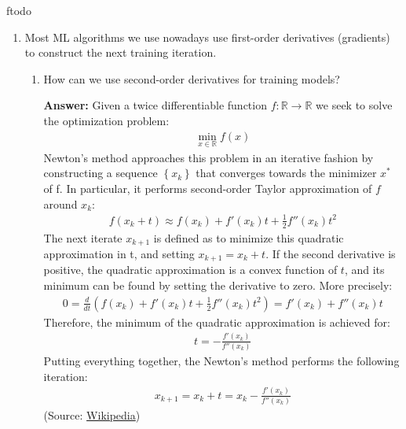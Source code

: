 ƒtodo\documentclass{article}
\newenvironment{QandA}{\begin{enumerate}[label=\arabic*.]}{\end{enumerate}}
\newenvironment{InnerQandA}{\begin{enumerate}[label=\roman*.]}{\end{enumerate}}
\newenvironment{answer}{\par\normalfont \textbf{Answer:}}{}
\newcommand{\R}{\mathbb{R}}
\begin{document}
\begin{QandA}
    \item Most ML algorithms we use nowadays use first-order derivatives (gradients) to construct the next training iteration.
    \begin{InnerQandA}
        \item How can we use second-order derivatives for training models?
        \begin{answer}
            Given a twice differentiable function $f: \R \rightarrow \R$ we seek to solve the optimization problem:
            \begin{align*}
                \min_{x \in \R} f(x)
            \end{align*}
            Newton's method approaches this problem in an iterative fashion by constructing a sequence $\left\{ x_k \right\}$ that converges towards the minimizer $x^{*}$ of f. In particular, it performs second-order Taylor approximation of $f$ around $x_k$:
            \begin{align*}
                f(x_k + t) \approx f(x_k) + f'(x_k)t + \frac{1}{2} f''(x_k)t^2
            \end{align*}
            The next iterate $x_{k+1}$ is defined as to minimize this quadratic approximation in t, and setting $x_{k+1} = x_k + t$. If the second derivative is positive, the quadratic approximation is a convex function of $t$, and its minimum can be found by setting the derivative to zero. More precisely:
            \begin{align*}
                0 = \frac{d}{dt} \left( f(x_k) + f'(x_k)t + \frac{1}{2} f''(x_k)t^2 \right) = f'(x_k) + f''(x_k)t
            \end{align*}
            Therefore, the minimum of the quadratic approximation is achieved for:
            \begin{align*}
                t = -\frac{f'(x_k)}{f''(x_k)}
            \end{align*}
            Putting everything together, the Newton's method performs the following iteration:
            \begin{align*}
                x_{k+1} = x_k + t = x_k -\frac{f'(x_k)}{f''(x_k)}
            \end{align*}
            (Source: \href{https://en.wikipedia.org/wiki/Newton%27s_method_in_optimization}{Wikipedia})
        \end{answer}


\end{InnerQandA}
\end{QandA}
\end{document}
